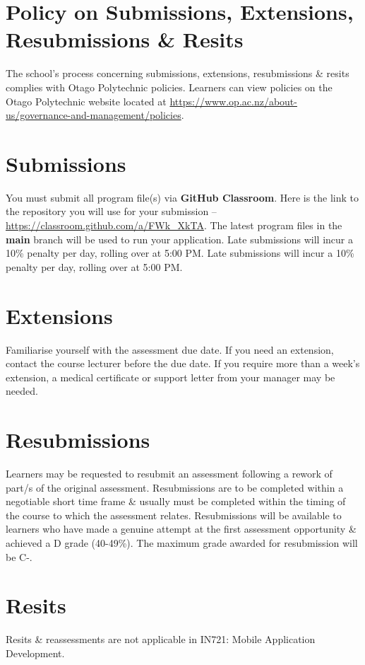\documentclass{article}
\begin{document}
\section*{Policy on Submissions, Extensions, Resubmissions \& Resits}
The school's process concerning submissions, extensions, resubmissions \& resits complies with Otago Polytechnic policies. Learners can view policies on the Otago Polytechnic website located at \href{https://www.op.ac.nz/about-us/governance-and-management/policies}{https://www.op.ac.nz/about-us/governance-and-management/policies}.

\section*{Submissions}
You must submit all program file(s) via \textbf{GitHub Classroom}. Here is the link to the repository you will use for your submission – \href{https://classroom.github.com/a/FWk\_XkTA}{https://classroom.github.com/a/FWk\_XkTA}. The latest program files in the \textbf{main} branch will be used to run your application. Late submissions will incur a 10\% penalty per day, rolling over at 5:00 PM. Late submissions will incur a 10\% penalty per day, rolling over at 5:00 PM.

\section*{Extensions}
Familiarise yourself with the assessment due date. If you need an extension, contact the course lecturer before the due date. If you require more than a week's extension, a medical certificate or support letter from your manager may be needed.

\section*{Resubmissions}
Learners may be requested to resubmit an assessment following a rework of part/s of the original assessment. Resubmissions are to be completed within a negotiable short time frame \& usually must be completed within the timing of the course to which the assessment relates. Resubmissions will be available to learners who have made a genuine attempt at the first assessment opportunity \& achieved a D grade (40-49\%). The maximum grade awarded for resubmission will be C-.

\section*{Resits}
Resits \& reassessments are not applicable in IN721: Mobile Application Development.
\end{document}
